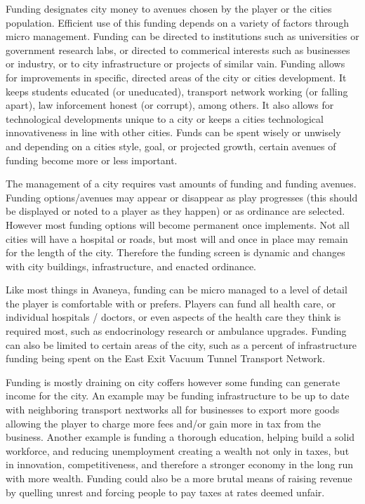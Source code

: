 
Funding designates city money to avenues chosen by the player or the cities population. Efficient use of this funding depends on a variety of factors through micro management. Funding can be directed to institutions such as universities or government research labs, or directed to commerical interests such as businesses or industry, or to city infrastructure or projects of similar vain. Funding allows for improvements in specific, directed areas of the city or cities development. It keeps students educated (or uneducated), transport network working (or falling apart), law inforcement honest (or corrupt), among others. It also allows for technological developments unique to a city or keeps a cities technological innovativeness in line with other cities. Funds can be spent wisely or unwisely and depending on a cities style, goal, or projected growth, certain avenues of funding become more or less important.

The management of a city requires vast amounts of funding and funding avenues. Funding options/avenues may appear or disappear as play progresses (this should be displayed or noted to a player as they happen) or as ordinance are selected. However most funding options will become permanent once implements. Not all cities will have a hospital or roads, but most will and once in place may remain for the length of the city. Therefore the funding screen is dynamic and changes with city buildings, infrastructure, and enacted ordinance.

Like most things in Avaneya, funding can be micro managed to a level of detail the player is comfortable with or prefers. Players can fund all health care, or individual hospitals / doctors, or even aspects of the health care they think is required most, such as endocrinology research or ambulance upgrades. Funding can also be limited to certain areas of the city, such as a percent of infrastructure funding being spent on the East Exit Vacuum Tunnel Transport Network.

Funding is mostly draining on city coffers however some funding can generate income for the city. An example may be funding infrastructure to be up to date with neighboring transport nextworks all for businesses to export more goods allowing the player to charge more fees and/or gain more in tax from the business. Another example is funding a thorough education, helping build a solid workforce, and reducing unemployment creating a wealth not only in taxes, but in innovation, competitiveness, and therefore a stronger economy in the long run with more wealth. Funding could also be a more brutal means of raising revenue by quelling unrest and forcing people to pay taxes at rates deemed unfair.



